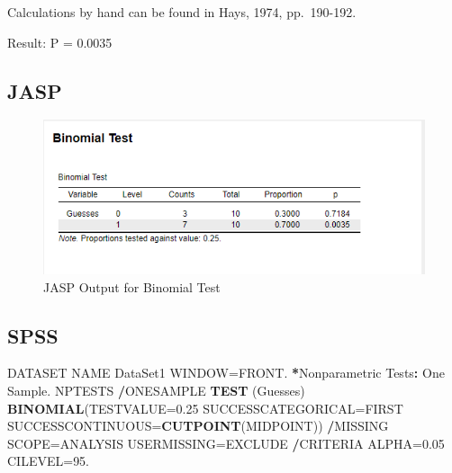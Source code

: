 \documentclass[
]{book}
\newenvironment{Shaded}{\begin{snugshade}}{\end{snugshade}}
\newcommand{\DataTypeTok}[1]{\textcolor[rgb]{0.13,0.29,0.53}{#1}}
\newcommand{\FloatTok}[1]{\textcolor[rgb]{0.00,0.00,0.81}{#1}}
\newcommand{\KeywordTok}[1]{\textcolor[rgb]{0.13,0.29,0.53}{\textbf{#1}}}
\newcommand{\NormalTok}[1]{#1}
\newcommand{\OperatorTok}[1]{\textcolor[rgb]{0.81,0.36,0.00}{\textbf{#1}}}
\newcommand{\StringTok}[1]{\textcolor[rgb]{0.31,0.60,0.02}{#1}}
\begin{document}
Calculations by hand can be found in Hays, 1974, pp.~190-192.

Result: P = 0.0035

\hypertarget{jasp}{%
\subsection{JASP}\label{jasp}}

\begin{figure}[!h]
\includegraphics{Screenshots/Binomial Test/BinomialTestJASP} \caption{\label{fig:BinomialTestJASP}JASP Output for Binomial Test}\label{fig:BinomialTestJASP}
\end{figure}

\hypertarget{spss}{%
\subsection{SPSS}\label{spss}}

\begin{Shaded}
\begin{Highlighting}[]
\NormalTok{DATASET NAME DataSet1 WINDOW=FRONT. }
\OperatorTok{*}\NormalTok{Nonparametric Tests}\OperatorTok{:}\StringTok{ }\NormalTok{One Sample. }
\NormalTok{NPTESTS }
  \OperatorTok{/}\NormalTok{ONESAMPLE }\KeywordTok{TEST}\NormalTok{ (Guesses) }\KeywordTok{BINOMIAL}\NormalTok{(}\DataTypeTok{TESTVALUE=}\FloatTok{0.25} \DataTypeTok{SUCCESSCATEGORICAL=}\NormalTok{FIRST }\DataTypeTok{SUCCESSCONTINUOUS=}\KeywordTok{CUTPOINT}\NormalTok{(MIDPOINT)) }
  \OperatorTok{/}\NormalTok{MISSING SCOPE=ANALYSIS USERMISSING=EXCLUDE }
  \OperatorTok{/}\NormalTok{CRITERIA ALPHA=}\FloatTok{0.05}\NormalTok{ CILEVEL=}\FloatTok{95.}
\end{Highlighting}
\end{Shaded}
\end{document}
